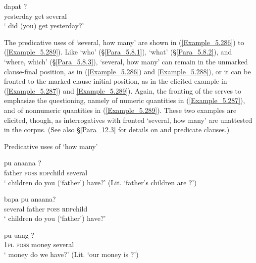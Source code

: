 \ea
\label{Example_5.285}
 {dapat} {} {?}\\ %
 yesterday  get  several  \\
 ‘ did (you) get yesterday?’ \textstyleExampleSource{[080925-003-Cv.0090]}
\z


The predicative uses of  ‘several, how many’ are shown in (\ref{Example_5.286}) to (\ref{Example_5.289}). Like  ‘who’ (§\ref{Para_5.8.1}),  ‘what’ (§\ref{Para_5.8.2}), and  ‘where, which’ (§\ref{Para_5.8.3}),  ‘several, how many’ can remain in the unmarked clause-final position, as in (\ref{Example_5.286}) and \ref{Example_5.288}), or it can be fronted to the marked clause-initial position, as in the elicited example in (\ref{Example_5.287}) and \ref{Example_5.289}). Again, the fronting of the  serves to emphasize the questioning, namely of numeric quantities in (\ref{Example_5.287}), and of nonnumeric quantities in (\ref{Example_5.289}). These two examples are elicited, though, as interrogatives with fronted  ‘several, how many’ are unattested in the corpus. (See also §\ref{Para_12.3} for details on  and  predicate clauses.)


\begin{styleExampleTitle}
Predicative uses of  ‘how many’
\end{styleExampleTitle}

\ea
\label{Example_5.286}
 {pu} {ana{\Tilde}ana} {?}\\ %
 father  \textsc{poss}  \textsc{rdp}{\Tilde}child  several\\
\glt 
‘ children do you (‘father’) have?’ (Lit. ‘father’s children are ?’) \textstyleExampleSource{[080923-009-Cv.0010]}
\z

\ea
\label{Example_5.287}
 {bapa} {pu} {ana{\Tilde}ana?}\\ %
 several  father  \textsc{poss}  \textsc{rdp}{\Tilde}child\\
\glt 
‘ children do you (‘father’) have?’ \textstyleExampleSource{[Elicited MY131112.007]}
\z

\ea
\label{Example_5.288}
 {pu} {uang} {?}\\ %
 \textsc{1pl}  \textsc{poss}  money  several\\
\glt 
‘ money do we have?’ (Lit. ‘our money is ?’) \textstyleExampleSource{[081006-017-Cv.0015]}
\z

